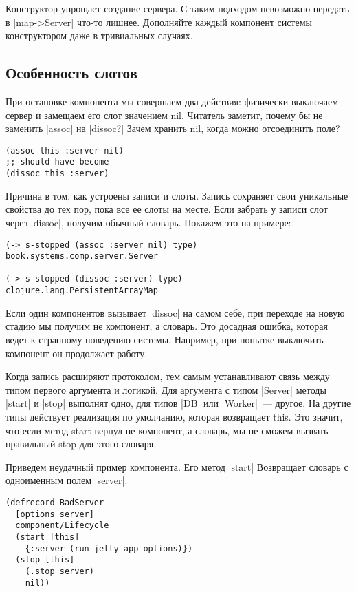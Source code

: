 Конструктор упрощает создание сервера. С таким подходом невозможно передать в
\spverb|map->Server| что-то лишнее. Дополняйте каждый компонент системы конструктором
даже в тривиальных случаях.

\subsection{Особенность слотов}

При остановке компонента мы совершаем два действия: физически выключаем сервер и
замещаем его слот значением nil. Читатель заметит, почему бы не заменить \spverb|assoc|
на \spverb|dissoc?| Зачем хранить nil, когда можно отсоединить поле?

\begin{verbatim}
(assoc this :server nil)
;; should have become
(dissoc this :server)
\end{verbatim}

Причина в том, как устроены записи и слоты. Запись сохраняет свои уникальные
свойства до тех пор, пока все ее слоты на месте. Если забрать у записи слот
через \spverb|dissoc|, получим обычный словарь. Покажем это на примере:

\begin{verbatim}
(-> s-stopped (assoc :server nil) type)
book.systems.comp.server.Server

(-> s-stopped (dissoc :server) type)
clojure.lang.PersistentArrayMap
\end{verbatim}

Если один компонентов вызывает \spverb|dissoc| на самом себе, при переходе на новую
стадию мы получим не компонент, а словарь. Это досадная ошибка, которая ведет к
странному поведению системы. Например, при попытке выключить компонент он
продолжает работу.

Когда запись расширяют протоколом, тем самым устанавливают связь между типом
первого аргумента и логикой. Для аргумента с типом \spverb|Server| методы \spverb|start| и
\spverb|stop| выполнят одно, для типов \spverb|DB| или \spverb|Worker|~--- другое. На другие типы
действует реализация по умолчанию, которая возвращает this. Это значит, что если
метод start вернул не компонент, а словарь, мы не сможем вызвать правильный stop
для этого словаря.

Приведем неудачный пример компонента. Его метод \spverb|start| Возвращает словарь с
одноименным полем \spverb|server|:

\begin{verbatim}
(defrecord BadServer
  [options server]
  component/Lifecycle
  (start [this]
    {:server (run-jetty app options)})
  (stop [this]
    (.stop server)
    nil))
\end{verbatim}

